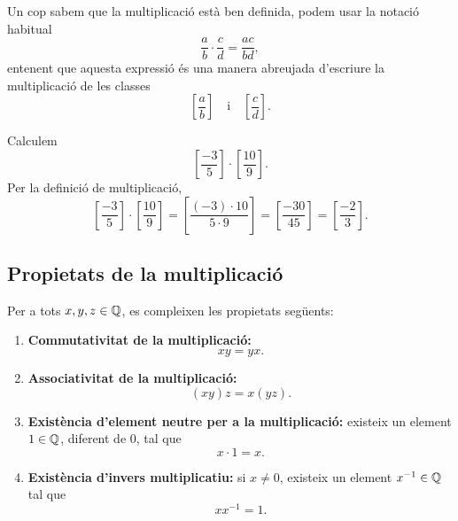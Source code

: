 Un cop sabem que la multiplicació està ben definida, podem usar la notació habitual
\[
	\frac{a}{b}\cdot\frac{c}{d}
	=
	\frac{ac}{bd},
\]
entenent que aquesta expressió és una manera abreujada d'escriure la multiplicació de les classes
\[
	\left[\frac{a}{b}\right]
	\quad\text{i}\quad
	\left[\frac{c}{d}\right].
\]

\begin{exemple}
Calculem
\[
	\left[\frac{-3}{5}\right]
	\cdot
	\left[\frac{10}{9}\right].
\]
Per la definició de multiplicació,
\[
	\left[\frac{-3}{5}\right]
	\cdot
	\left[\frac{10}{9}\right]
	=
	\left[\frac{(-3)\cdot10}{5\cdot9}\right]
	=
	\left[\frac{-30}{45}\right]
	=
	\left[\frac{-2}{3}\right].
\]
\end{exemple}

\subsection{Propietats de la multiplicació}

\begin{proposicio}
Per a tots \(x,y,z\in\mathbb{Q}\), es compleixen les propietats següents:
\begin{enumerate}
	\item \textbf{Commutativitat de la multiplicació:}
	\[
		xy=yx.
	\]

	\item \textbf{Associativitat de la multiplicació:}
	\[
		(xy)z=x(yz).
	\]

	\item \textbf{Existència d'element neutre per a la multiplicació:}
	existeix un element \(1\in\mathbb{Q}\), diferent de \(0\), tal que
	\[
		x\cdot 1=x.
	\]

	\item \textbf{Existència d'invers multiplicatiu:}
	si \(x\neq0\), existeix un element \(x^{-1}\in\mathbb{Q}\) tal que
	\[
		xx^{-1}=1.
	\]
\end{enumerate}
\end{proposicio}

